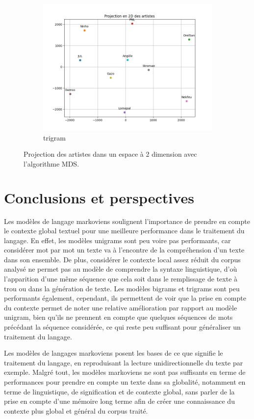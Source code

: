 \documentclass[a4paper]{article}
\begin{document}
\begin{figure}[ht]
\begin{subfigure}{0.32\textwidth}
        \includegraphics[width=\linewidth]{../results/genius_results/MDS_3.png}
        \caption{trigram}
    \end{subfigure}
    \hfill
    \caption{Projection des artistes dans un espace à 2 dimension avec l'algorithme MDS.}
    \label{fig:MDS}
\end{figure}



\section{Conclusions et perspectives}
Les modèles de langage markoviens soulignent l'importance de prendre en compte le contexte global textuel pour une meilleure 
performance dans le traitement du langage. En effet, les modèles unigrams sont peu voire pas performants, car considérer mot par 
mot un texte va à l'encontre de la compréhension d'un texte dans son ensemble. De plus, considérer le contexte local assez réduit 
du corpus analysé ne permet pas au modèle de comprendre la syntaxe linguistique, d'où l'apparition d'une même séquence que cela soit 
dans le remplissage de texte à trou ou dans la génération de texte. Les modèles bigrams et trigrams sont peu performants également, 
cependant, ils permettent de voir que la prise en compte du contexte permet de noter une relative amélioration par rapport au modèle 
unigram, bien qu'ils ne prennent en compte que quelques séquences de mots précédant la séquence considérée, ce qui reste peu suffisant 
pour généraliser un traitement du langage. 

Les modèles de langages markoviens posent les bases de ce que signifie le traitement du langage, en reproduisant la lecture 
unidirectionnelle du texte par exemple. Malgré tout, les modèles markoviens ne sont pas suffisants en terme de performances pour 
prendre en compte un texte dans sa globalité, notamment en terme de linguistique, de signification et de contexte global, sans 
parler de la prise en compte d'une mémoire long terme afin de créer une connaissance du contexte plus global et général du corpus 
traité. 
\end{document}
